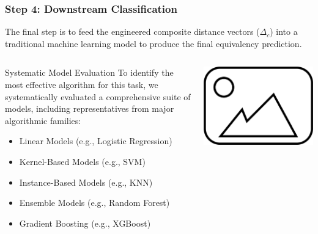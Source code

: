 \documentclass[aspectratio=169,10pt]{beamer}
\begin{document}
\begin{frame}
    \frametitle{Step 4: Downstream Classification}
    
    The final step is to feed the engineered composite distance vectors (\(\Delta_c\)) into a traditional machine learning model to produce the final equivalency prediction.
    
    \begin{columns}[T]
        \begin{column}{0.5\textwidth}
            \begin{block}{Systematic Model Evaluation}
                To identify the most effective algorithm for this task, we systematically evaluated a comprehensive suite of models, including representatives from major algorithmic families:
                \begin{itemize}
                    \item Linear Models (e.g., Logistic Regression)
                    \item Kernel-Based Models (e.g., SVM)
                    \item Instance-Based Models (e.g., KNN)
                    \item Ensemble Models (e.g., Random Forest)
                    \item Gradient Boosting (e.g., XGBoost)
                \end{itemize}
            \end{block}
        \end{column}
        
        \begin{column}{0.5\textwidth}
            \centering
            \includegraphics[width=\textwidth]{placeholder.png}
        \end{column}
    \end{columns}


\end{frame}
\end{document}
